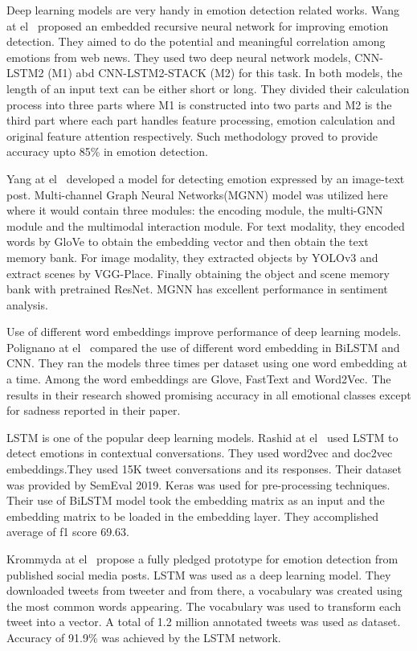 \documentclass[runningheads]{llncs}
\begin{document}
Deep learning models are very handy in emotion detection related works. Wang at el~\cite{ref26} proposed an embedded recursive neural network for improving emotion detection. They aimed to do the potential and meaningful correlation among emotions from web news. They used two deep neural network models, CNN-LSTM2 (M1) abd CNN-LSTM2-STACK (M2) for this task. In both models, the length of an input text can be either short or long. They divided their calculation process into three parts where M1 is constructed into two parts and M2 is the third part where each part handles feature processing, emotion calculation and original feature attention respectively. Such methodology proved to provide accuracy upto 85\% in emotion detection. 

Yang at el~\cite{ref27} developed a model for detecting emotion expressed by an image-text post. Multi-channel Graph Neural Networks(MGNN) model was utilized here where it would contain three modules: the encoding module, the multi-GNN module and the multimodal interaction module. For text modality, they encoded words by GloVe to obtain the embedding vector and then obtain the text memory bank. For image modality, they extracted objects by YOLOv3 and extract scenes by VGG-Place. Finally obtaining the object and scene memory bank with pretrained ResNet. MGNN has excellent performance in sentiment analysis.

Use of different word embeddings improve performance of deep learning models. Polignano at el~\cite{ref28} compared the use of different word embedding in BiLSTM and CNN. They ran the models three times per dataset using one word embedding at a time. Among the word embeddings are Glove, FastText and Word2Vec. The results in their research showed promising accuracy in all emotional classes except for sadness reported in their paper.

LSTM is one of the popular deep learning models. Rashid at el~\cite{ref29} used LSTM to detect emotions in contextual conversations. They used word2vec and doc2vec embeddings.They used 15K tweet conversations and its responses. Their dataset was provided by SemEval 2019. Keras was used for pre-processing techniques. Their use of BiLSTM model took the embedding matrix as an input and the embedding matrix to be loaded in the embedding layer. They accomplished average of f1 score 69.63.

Krommyda at el~\cite{ref30} propose a fully pledged prototype for emotion detection from published social media posts. LSTM was used as a deep learning model. They downloaded tweets from tweeter and from there, a vocabulary was created using the most common words appearing. The vocabulary was used to transform each tweet into a vector. A total of 1.2 million annotated tweets was used as dataset. Accuracy of 91.9\% was achieved by the LSTM network.
\end{document}
